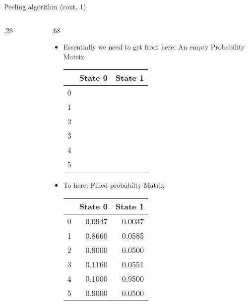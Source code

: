\documentclass[9pt,ignorenonframetext,]{beamer}
\newcommand{\includetikz}[2]{
\begin{figure}
\scalebox{#2}{

}
\end{figure}
}
\def\begincols{\begin{columns}[T]}
\def\begincol{\begin{column}[T]}
\def\endcol{\end{column}}
\def\endcols{\end{columns}}
\begin{document}
\begin{frame}[t]{Peeling algorithm (cont. 1)}

\begincols

\begincol{.28\textwidth}

\includetikz{simple_tree.tex}{.6}

\endcol

\begincol{.68\textwidth}

\footnotesize

\normalsize

\pause

\begin{itemize}
\item
  Essentially we need to get from here: An empty Probability Matrix

  \footnotesize

  \begin{longtable}[]{@{}lll@{}}
  \toprule
  & State 0 & State 1\tabularnewline
  \midrule
  \endhead
  0 & &\tabularnewline
  1 & &\tabularnewline
  2 & &\tabularnewline
  3 & &\tabularnewline
  4 & &\tabularnewline
  5 & &\tabularnewline
  \bottomrule
  \end{longtable}

  \normalsize

  \pause
\item
  To here: Filled probabilty Matrix

  \footnotesize

  \begin{longtable}[]{@{}lrr@{}}
  \toprule
  & State 0 & State 1\tabularnewline
  \midrule
  \endhead
  0 & 0.0947 & 0.0037\tabularnewline
  1 & 0.8660 & 0.0585\tabularnewline
  2 & 0.9000 & 0.0500\tabularnewline
  3 & 0.1160 & 0.0551\tabularnewline
  4 & 0.1000 & 0.9500\tabularnewline
  5 & 0.9000 & 0.0500\tabularnewline
  \bottomrule
  \end{longtable}

  \normalsize
\end{itemize}

\endcol

\endcols

\end{frame}
\end{document}
